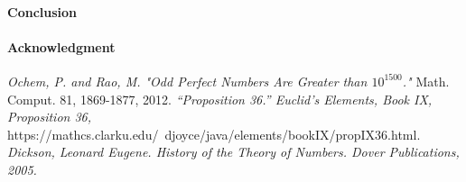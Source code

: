 \documentclass[12pt]{article}
\begin{document}
\paragraph*{Conclusion}

\paragraph*{Acknowledgment}


\begin{thebibliography}{5}
\textit{Ochem, P. and Rao, M. "Odd Perfect Numbers Are Greater than $10^{1500}$."} Math. Comput. 81, 1869-1877, 2012.
\textit{“Proposition 36.” Euclid's Elements, Book IX, Proposition 36,} https://mathcs.clarku.edu/~djoyce/java/elements/bookIX/propIX36.html.
\textit{Dickson, Leonard Eugene. History of the Theory of Numbers. Dover Publications, 2005.}
\end{thebibliography}
\end{document}
